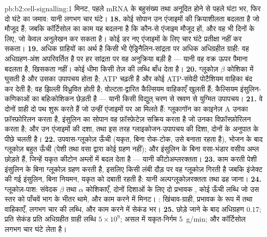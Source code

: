 \begin{solution}{pb:b2:cell-signalling:1}
मिनट, पहले mRNA के बहुसंख्य तथा अनूदित होने से पहले घंटा भर,
फिर दो घंटे का जमाव: यानी लगभग चार घंटे।
\textbf{18.} कोई सोपान उन एंजाइमों की क्रियाशीलता बदलता है जो मौजूद हैं;
जबकि कॉर्टिसोल का काम यह बदलना है कि कौन-से एंजाइम मौजूद हों, और वह भी दिनों के लिए, जो
केवल अनुलेखन कर सकता है। कोई डर नए एंजाइमों के लिए चार घंटे प्रतीक्षा नहीं
कर सकता।
\textbf{19.} अधिक ग्राहियों का अर्थ है किसी भी ऐड्रिनैलिन-सांद्रता पर
अधिक अधिग्रहीत ग्राही: वह अधिग्रहण-अंश अपरिवर्तित है पर
हर सांद्रता पर वह अनुक्रिया बड़ी है --- यानी वह वक्र
ऊपर पैमाना बदलता है, खिसकता नहीं। कोई धीमा  किसी तेज़ की लब्धि बाँध देता है।
\textbf{20.} ग्लूकोज़ $\beta$ कोशिका में घुसती है और उसका उपापचय होता है; ATP
चढ़ती है और कोई ATP-संवेदी पोटैशियम वाहिका बंद कर देती है; वह झिल्ली
विध्रुवित होती है; वोल्टता-द्वारित कैल्सियम वाहिकाएँ खुलती हैं; कैल्सियम
इंसुलिन-कणिकाओं का बहिःकोशिकन छेड़ती है --- यानी किसी विद्युत् चरण से
स्रवण से युग्मित उपापचय।
\textbf{21.} वे दोनों ग्राही दो पथ शुरू करते हैं जो उन्हीं एंजाइमों पर
आ मिलते हैं: ग्लूकागॉन का काइनेज़ A उनका फ़ॉस्फ़ोरिलन करता है, इंसुलिन का
सोपान वह फ़ॉस्फ़ेटेज़ सक्रिय करता है जो उनका विफ़ॉस्फ़ोरिलन करता है; और उन
एंजाइमों की दशा, तथा इस तरह ग्लाइकोजन-उपापचय की दिशा,
दोनों के अनुपात के पीछे चलती है।
\textbf{22.} उपवास-ग्लूकोज़ ऊँची (यकृत, बिना रोक-टोक, उसे
बनाता रहता है), भोजन के बाद ग्लूकोज़ बहुत ऊँची (पेशी तथा वसा द्वारा कोई ग्रहण नहीं);
और इंसुलिन के बिना वसा-भंडार वसीय अम्ल छोड़ते हैं, जिन्हें
यकृत कीटोन अम्लों में बदल देता है --- यानी कीटोअम्लरक्तता।
\textbf{23.} काम करती पेशी इंसुलिन के बिना ग्लूकोज़ ग्रहण करती है, इसलिए किसी
लंबी दौड़ पर वह ग्लूकोज़ गिरती है जबकि इंजेक्ट की गई इंसुलिन, बिना नियमन,
यकृत को दबाती रहती है: यानी अल्पग्लूकोज़रक्तता तथा ढह जाना।
\textbf{24.} ग्लूकोज़-पाश: संवेदक $\beta$ तथा $\alpha$ कोशिकाएँ,
दोनों दिशाओं के लिए दो प्रभावक , कोई ऊँची लब्धि जो उस स्तर को
पाँचवें भाग के भीतर थामे, और काम करने में मिनट। :
खिंचाव-ग्राही, प्रभावक के रूप में  तथा वाहिकाएँ, लगभग चार की लब्धि, और काम करने में
सेकंड भर।
\textbf{25.} छोड़े जाने के बाद अधिग्रहण $0.17$; प्रति सेकंड प्रति अधिग्रहीत ग्राही
लब्धि $5\times 10^{9}$; असल में यकृत-निर्गम \qty{5}{g/min}; और कॉर्टिसोल
लगभग चार घंटे लेता है।
\end{solution}
